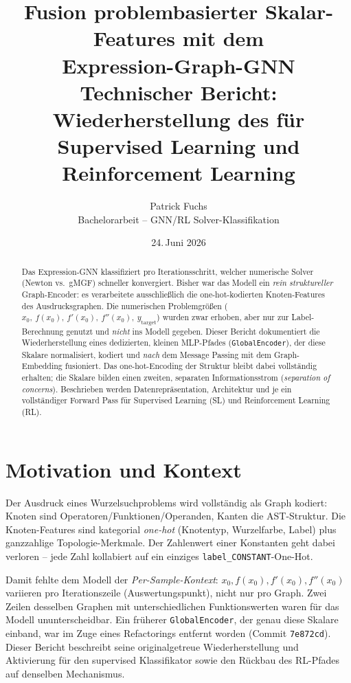 \documentclass[11pt,a4paper]{article}
\title{\textbf{Fusion problembasierter Skalar-Features mit dem\\
Expression-Graph-GNN}\\[2pt]
\large Technischer Bericht: Wiederherstellung des \code{GlobalEncoder} für\\
Supervised Learning und Reinforcement Learning}
\author{Patrick Fuchs \\ \small Bachelorarbeit -- GNN/RL Solver-Klassifikation}
\date{24.\,Juni 2026}
\newcommand{\code}[1]{\texttt{#1}}
\begin{document}
\maketitle
\thispagestyle{fancy}

\begin{abstract}
\noindent
Das Expression-GNN klassifiziert pro Iterationsschritt, welcher numerische Solver
(Newton vs.\ gMGF) schneller konvergiert. Bisher war das Modell ein \emph{rein
struktureller} Graph-Encoder: es verarbeitete ausschließlich die one-hot-kodierten
Knoten-Features des Ausdrucksgraphen. Die numerischen Problemgrößen
($x_0,\ f(x_0),\ f'(x_0),\ f''(x_0),\ y_{\text{target}}$) wurden zwar erhoben, aber nur zur
Label-Berechnung genutzt und \emph{nicht} ins Modell gegeben. Dieser Bericht
dokumentiert die Wiederherstellung eines dedizierten, kleinen MLP-Pfades
(\code{GlobalEncoder}), der diese Skalare normalisiert, kodiert und \emph{nach} dem
Message Passing mit dem Graph-Embedding fusioniert. Das one-hot-Encoding der
Struktur bleibt dabei vollständig erhalten; die Skalare bilden einen zweiten,
separaten Informationsstrom (\emph{separation of concerns}). Beschrieben werden
Datenrepräsentation, Architektur und je ein vollständiger Forward Pass für
Supervised Learning (SL) und Reinforcement Learning (RL).
\end{abstract}

\section{Motivation und Kontext}

Der Ausdruck eines Wurzelsuchproblems wird vollständig als Graph kodiert: Knoten sind
Operatoren/Funktionen/Operanden, Kanten die AST-Struktur. Die Knoten-Features sind
kategorial \emph{one-hot} (Knotentyp, Wurzelfarbe, Label) plus ganzzahlige
Topologie-Merkmale. Der Zahlenwert einer Konstanten geht dabei verloren -- jede
Zahl kollabiert auf ein einziges \code{label\_CONSTANT}-One-Hot.

Damit fehlte dem Modell der \emph{Per-Sample-Kontext}: $x_0, f(x_0), f'(x_0), f''(x_0)$
variieren pro Iterationszeile (Auswertungspunkt), nicht nur pro Graph. Zwei Zeilen
desselben Graphen mit unterschiedlichen Funktionswerten waren für das Modell
ununterscheidbar. Ein früherer \code{GlobalEncoder}, der genau diese Skalare einband,
war im Zuge eines Refactorings entfernt worden (Commit \code{7e872cd}). Dieser Bericht
beschreibt seine originalgetreue Wiederherstellung und Aktivierung für den
supervised Klassifikator sowie den Rückbau des RL-Pfades auf denselben Mechanismus.
\end{document}
